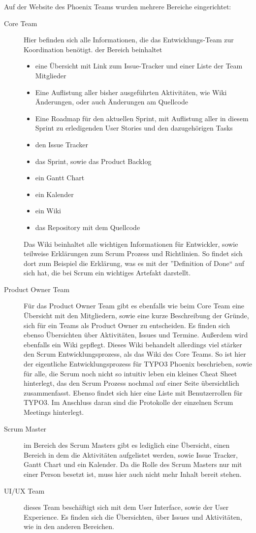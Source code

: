 Auf der Website des Phoenix Teams wurden mehrere Bereiche eingerichtet:
\begin{description}
\item [Core Team] Hier befinden sich alle Informationen, die das Entwicklungs-Team zur Koordination
benötigt. der Bereich beinhaltet
\begin{itemize}
\item eine Übersicht mit Link zum Issue-Tracker und einer Liste der Team Mitglieder
\item Eine Auflistung aller bisher ausgeführten Aktivitäten, wie Wiki Änderungen, oder auch
Änderungen am Quellcode
\item Eine Roadmap für den aktuellen Sprint, mit Auflistung aller in diesem Sprint zu erledigenden
User Stories und den dazugehörigen Tasks
\item den Issue Tracker
\item das Sprint, sowie das Product Backlog
\item ein Gantt Chart
\item ein Kalender
\item  ein Wiki
\item das Repository mit dem Quellcode
\end{itemize}
Das Wiki beinhaltet alle wichtigen Informationen für Entwickler, sowie teilweise Erklärungen zum
Scrum Prozess und Richtlinien.  So findet sich dort zum Beispiel die Erklärung, was es mit der
''Definition of Done``  auf sich hat, die bei Scrum ein wichtiges Artefakt darstellt.
\item [Product Owner Team] Für das Product Owner Team gibt es ebenfalls wie beim Core Team eine
Übersicht mit den Mitgliedern, sowie eine kurze Beschreibung der Gründe, sich für ein Teams als
Product Owner zu entscheiden. Es finden sich ebenso Übersichten über Aktivitäten, Issues und
Termine. Außerdem wird ebenfalls ein Wiki gepflegt. Dieses Wiki behandelt  allerdings viel
stärker den Scrum Entwicklungsprozess, als das Wiki des Core Teams. So ist hier der eigentliche
Entwicklungsprozess für TYPO3 Phoenix beschrieben, sowie für alle, die Scrum noch nicht so intuitiv
leben ein kleines Cheat Sheet hinterlegt, das den Scrum Prozess nochmal auf einer Seite
übersichtlich zusammenfasst. Ebenso findet sich hier eine Liste mit Benutzerrollen für TYPO3. Im
Anschluss daran sind die Protokolle der einzelnen Scrum Meetings hinterlegt.
\item [Scrum Master] im Bereich des Scrum Masters gibt es lediglich eine Übersicht, einen Bereich
in dem die Aktivitäten aufgelistet werden, sowie Issue Tracker, Gantt Chart und ein Kalender. Da
die Rolle des Scrum Masters nur mit einer Person besetzt ist, muss hier auch nicht mehr Inhalt
bereit stehen.
\item [UI/UX Team] dieses Team beschäftigt sich mit dem User Interface, sowie der User Experience.
Es finden sich die Übersichten, über Issues und Aktivitäten, wie in den anderen Bereichen. 
\end{description}

